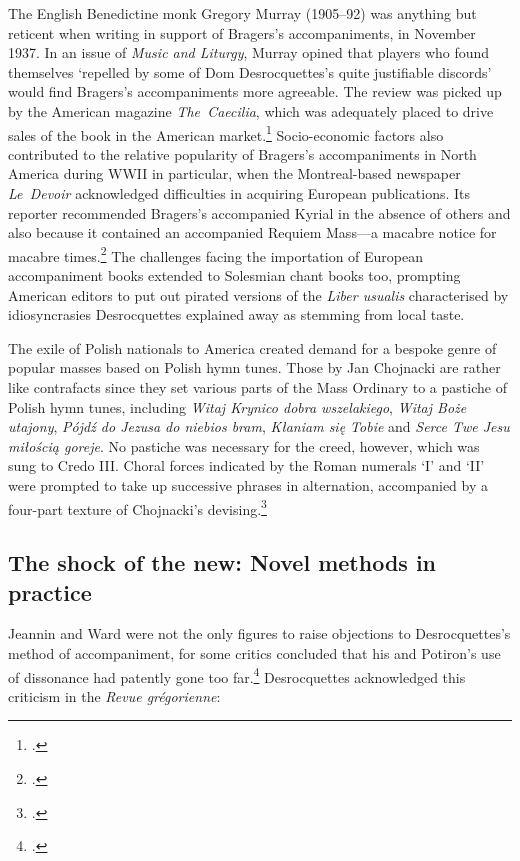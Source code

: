 The English Benedictine monk Gregory Murray (1905--92) was anything but reticent when writing in support of Bragers's accompaniments, in November 1937.
In an issue of \covid{}\emph{Music and Liturgy}, Murray opined that players who found themselves `repelled by some of Dom Desrocquettes's quite justifiable discords' would find Bragers's accompaniments more agreeable.
The review was picked up by the American magazine \emph{The~Caecilia}, which was adequately placed to drive sales of the book in the American market.\footcite[479]{BritishCriticsPraise1937}
Socio-economic factors also contributed to the relative popularity of Bragers's accompaniments in North America during WWII in particular, when the Montreal-based newspaper \emph{Le~Devoir} acknowledged difficulties in acquiring European publications.
Its reporter recommended Bragers's accompanied Kyrial in the absence of others and also because it contained an accompanied Requiem Mass---a macabre notice for macabre times.\footcite[4]{Mercureaccompagnementsgregoriensmaitre1942}
The challenges facing the importation of European accompaniment books extended to Solesmian chant books too, prompting American editors to put out pirated versions of the \emph{Liber usualis} characterised by idiosyncrasies Desrocquettes explained away as stemming from local taste.

The exile of Polish nationals to America created demand for a bespoke genre of \mbox{popular} masses based on Polish hymn tunes.
Those by Jan Chojnacki are rather like contrafacts since they set various parts of the Mass Ordinary to a pastiche of Polish hymn tunes, including \emph{Witaj Krynico dobra wszelakiego}, \emph{Witaj Boże utajony}, \emph{Pójdź do Jezusa do niebios bram}, \emph{Kłaniam się Tobie} and \emph{Serce Twe Jesu miłością goreje}.
No pastiche was necessary for the creed, however, which was sung to Credo III.
Choral forces indicated by the Roman numerals `I' and `II' were prompted to take up successive phrases in alternation, \mbox{accompanied} by a four-part texture of Chojnacki's devising.\footcite[2, 9--14]{ChojnackiHymnTuneMassCongregational1960}

\subsection{The shock of the new: Novel methods in practice}
Jeannin and Ward were not the only figures to raise objections to Desrocquettes's method of accompaniment, for some critics concluded that his and Potiron's use of dissonance had patently gone too far.\footnote{\cite[373]{Lessmannanachronismemusicalaccompagnement2019}.\label{fn:lessmann_373}}
Desrocquettes acknowledged this criticism in the \emph{Revue grégorienne}:
\pagebreak{}

